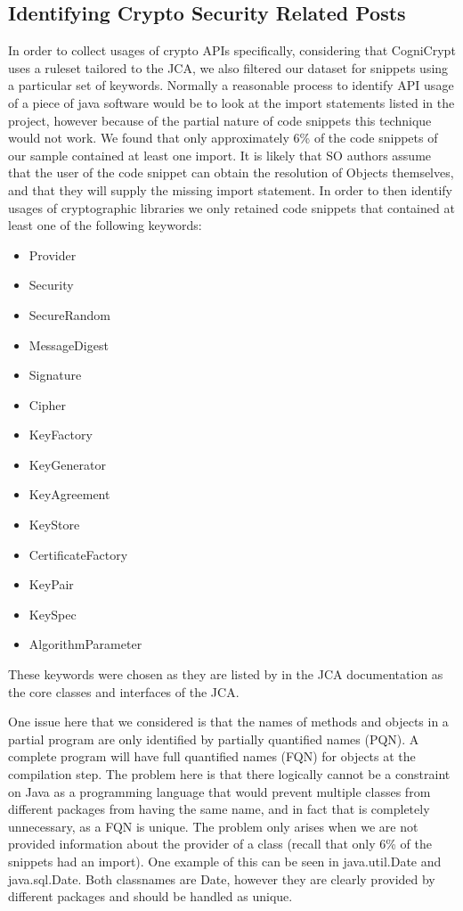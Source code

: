 \documentclass[10pt, conference]{IEEEtran}
\begin{document}
\subsection{Identifying Crypto Security Related Posts}
In order to collect usages of crypto APIs specifically, considering that CogniCrypt uses a ruleset tailored to the JCA, we also filtered our dataset for snippets using a particular set of keywords. 
Normally a reasonable process to identify API usage of a piece of java software would be to look at the import statements listed in the project, however because of the partial nature of code snippets this technique would not work. We found that only approximately 6\% of the code snippets of our sample contained at least one import. It is likely that SO authors assume that the user of the code snippet can obtain the resolution of Objects themselves, and that they will supply the missing import statement.
In order to then identify usages of cryptographic libraries we only retained code snippets that contained at least one of the following keywords:

\begin{itemize}
  \item Provider
  \item Security
  \item SecureRandom
  \item MessageDigest
  \item Signature
  \item Cipher
  \item KeyFactory
  \item KeyGenerator
  \item KeyAgreement
  \item KeyStore
  \item CertificateFactory
  \item KeyPair
  \item KeySpec
  \item AlgorithmParameter
\end{itemize}

 
These keywords were chosen as they are listed by in the JCA documentation \cite{JCA} as the core classes and interfaces of the JCA.

One issue here that we considered is that the names of methods and objects in a partial program are only identified by partially quantified names (PQN). A complete program will have full quantified names (FQN) for objects at the compilation step. The problem here is that there logically cannot be a constraint on Java as a programming language that would prevent multiple classes from different packages from having the same name, and in fact that is completely unnecessary, as a FQN is unique. The problem only arises when we are not provided information about the provider of a class (recall that only 6\% of the snippets had an import). One example of this can be seen in java.util.Date and java.sql.Date. Both classnames are Date, however they are clearly provided by different packages and should be handled as unique.
\end{document}
